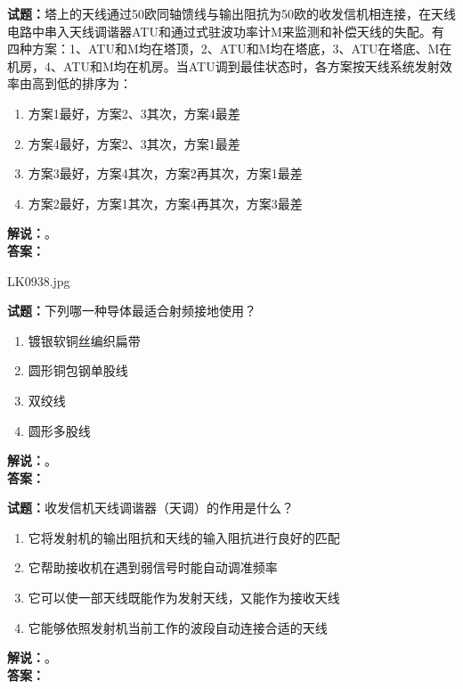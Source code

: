 \documentclass{ctexbook}
\begin{document}
\bigskip




\noindent\textbf{试题：}塔上的天线通过50欧同轴馈线与输出阻抗为50欧的收发信机相连接，在天线电路中串入天线调谐器ATU和通过式驻波功率计M来监测和补偿天线的失配。有四种方案：1、ATU和M均在塔顶，2、ATU和M均在塔底，3、ATU在塔底、M在机房，4、ATU和M均在机房。当ATU调到最佳状态时，各方案按天线系统发射效率由高到低的排序为：
\begin{enumerate}[leftmargin=3em]
\item 方案1最好，方案2、3其次，方案4最差
\item 方案4最好，方案2、3其次，方案1最差
\item 方案3最好，方案4其次，方案2再其次，方案1最差
\item 方案2最好，方案1其次，方案4再其次，方案3最差
\end{enumerate}
\noindent\textbf{解说：}\textbf{}。\\\noindent\textbf{答案：}

\bigskip

LK0938.jpg


\noindent\textbf{试题：}下列哪一种导体最适合射频接地使用？
\begin{enumerate}[leftmargin=3em]
\item 镀银软铜丝编织扁带
\item 圆形铜包钢单股线
\item 双绞线
\item 圆形多股线
\end{enumerate}
\noindent\textbf{解说：}\textbf{}。\\\noindent\textbf{答案：}

\bigskip




\noindent\textbf{试题：}收发信机天线调谐器（天调）的作用是什么？
\begin{enumerate}[leftmargin=3em]
\item 它将发射机的输出阻抗和天线的输入阻抗进行良好的匹配
\item 它帮助接收机在遇到弱信号时能自动调准频率
\item 它可以使一部天线既能作为发射天线，又能作为接收天线
\item 它能够依照发射机当前工作的波段自动连接合适的天线
\end{enumerate}
\noindent\textbf{解说：}\textbf{}。\\\noindent\textbf{答案：}

\bigskip
\end{document}
